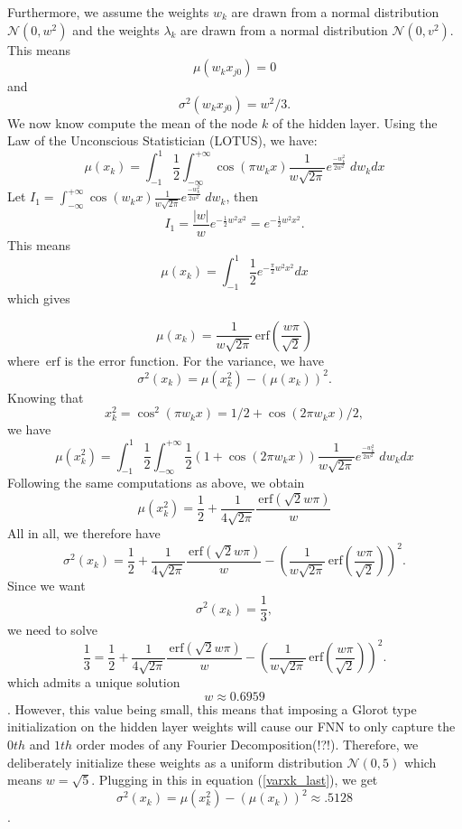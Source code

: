 \documentclass[11pt]{article}
\newcommand{\erf}{\, \mathrm{erf}}
\begin{document}
Furthermore, we assume the weights $w_k$ are drawn from a normal distribution $\mathcal N(0, w^2)$ and the weights $\lambda_k$ are drawn from a normal distribution $\mathcal N(0, v^2)$. This means $$\mu(w_k x_{j0}) = 0$$ and $$\sigma^2(w_k x_{j0}) = w^2/3.$$
We now know compute the mean of the node $k$ of the hidden layer. Using the Law of the Unconscious Statistician (LOTUS), we have:
\begin{equation}\label{muxk}
    \mu(x_k) = \int_{-1}^{1}\frac{1}{2} \int_{-\infty}^{+\infty} \cos(\pi w_k x)\frac{1}{w \sqrt{2\pi}} e^{\frac{-w_k^2}{2w^2}}\; dw_k dx 
\end{equation}
Let $I_1 = \int_{-\infty}^{+\infty} \cos(w_k x)\frac{1}{w \sqrt{2\pi}} e^{\frac{-w_k^2}{2w^2}}\; dw_k$, then
$$I_1 = \frac{|w|}{w}e^{-\frac{1}{2}w^2x^2} = e^{-\frac{1}{2}w^2x^2}. $$
This means
$$ \mu(x_k) = \int_{-1}^{1}\frac{1}{2} e^{-\frac{\pi}{2}w^2x^2} dx $$
which gives

\begin{equation}\label{muxk_last}
    \mu(x_k) = \frac{1}{w\sqrt{2\pi}}\erf\left(\frac{w\pi}{\sqrt{2}}\right) 
\end{equation}
where $\erf$ is the error function.
For the variance, we have $$\sigma^2(x_k) = \mu(x_k^2) - (\mu(x_k))^2.$$ Knowing that $$x_k^2 = \cos^2(\pi w_k x) = 1/2 + \cos(2\pi w_kx)/2,$$ we have
\begin{equation*}
    \mu(x_k^2) = \int_{-1}^{1}\frac{1}{2} \int_{-\infty}^{+\infty} \frac{1}{2}(1 + \cos(2 \pi w_k x))\frac{1}{w \sqrt{2\pi}} e^{\frac{-w_k^2}{2w^2}}\; dw_k dx
\end{equation*}
Following the same computations as above, we obtain 
$$\mu(x_k^2) = \frac{1}{2} + \frac{1}{4\sqrt{2\pi}}\frac{\erf(\sqrt{2}w\pi)}{w}$$ All in all, we therefore have
\begin{equation}\label{varxk_last}
    \sigma^2(x_k) = \frac{1}{2} + \frac{1}{4\sqrt{2\pi}}\frac{\erf(\sqrt{2}w\pi)}{w}-\left(\frac{1}{w\sqrt{2\pi}}\erf\left(\frac{w\pi}{\sqrt{2}}\right) \right)^2 .
\end{equation}
Since we want $$\sigma^2(x_k) = \frac{1}{3}, $$ we need to solve 
\begin{equation*}
    \frac{1}{3} = \frac{1}{2} + \frac{1}{4\sqrt{2\pi}}\frac{\erf(\sqrt{2}w\pi)}{w}-\left(\frac{1}{w\sqrt{2\pi}}\erf\left(\frac{w\pi}{\sqrt{2}}\right) \right)^2 .
\end{equation*}
which admits a unique solution $$w \approx 0.6959$$. However, this value being small, this means that imposing a Glorot type initialization on the hidden layer weights will cause our FNN to only capture the $0th$ and $1th$ order modes of any Fourier Decomposition(!?!). Therefore, we deliberately initialize these weights as a uniform distribution $\mathcal N(0,5)$ which means $w = \sqrt{5}$.  Plugging in this in equation (\ref{varxk_last}), we get
$$\sigma^2(x_k) = \mu(x_k^2) - (\mu(x_k))^2 \approx .5128$$. 
\end{document}
